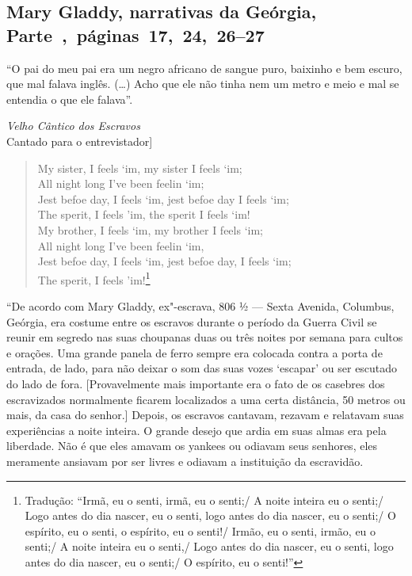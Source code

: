 \subsection{Mary Gladdy, narrativas da Geórgia, Parte~,~páginas~17,~24,~26--27}
\label{ref106}

``O pai do meu pai era um negro africano de sangue puro, baixinho e bem
escuro, que mal falava inglês. (\ldots{}) Acho que ele não tinha nem um
metro e meio e mal se entendia o que ele falava''.


\noindent{}\emph{Velho Cântico dos Escravos}\\
\noindent{}{[}Cantado para o entrevistador{]}

\begin{verse}
My sister, I feels `im, my sister I feels `im;\\
All night long I've been feelin `im;\\
Jest befoe day, I feels `im, jest befoe day I \qb{}feels `im;\\
The sperit, I feels 'im, the sperit I feels `im!\\
My brother, I feels `im, my brother I feels `im;\\
All night long I've been feelin `im,\\
Jest befoe day, I feels `im, jest befoe day, I \qb{}feels `im;\\
The sperit, I feels 'im!\footnote{Tradução: ``Irmã, eu o senti,
irmã, eu o senti;/ A noite inteira eu o senti;/ Logo antes
do dia nascer, eu o senti, logo antes do dia nascer, eu o senti;/ O espírito, eu o
senti, o espírito, eu o senti!/ Irmão, eu o senti,
irmão, eu o senti;/ A noite inteira eu o senti,/ Logo antes
do dia nascer, eu o senti, logo antes do dia nascer, eu o senti;/ O espírito, eu o senti!''}
\end{verse}

``De acordo com Mary Gladdy, ex"-escrava, 806 ½ --- Sexta Avenida,
Columbus, Geórgia, era costume entre os escravos durante o período da
Guerra Civil se reunir em segredo nas suas choupanas duas ou três noites
por semana para cultos e orações. Uma grande panela de ferro sempre era
colocada contra a porta de entrada, de lado, para não deixar o som das
suas vozes `escapar' ou ser escutado do lado de fora. {[}Provavelmente
mais importante era o fato de os casebres dos escravizados normalmente
ficarem localizados a uma certa distância, 50 metros ou mais, da casa do
senhor.{]} Depois, os escravos cantavam, rezavam e relatavam suas
experiências a noite inteira. O grande desejo que ardia em suas almas
era pela liberdade. Não é que eles amavam os yankees ou odiavam seus
senhores, eles meramente ansiavam por ser livres e odiavam a instituição
da escravidão.

